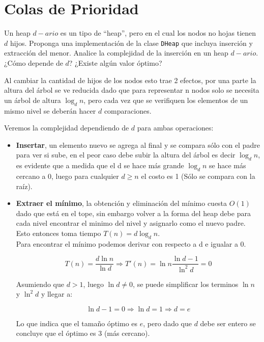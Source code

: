 \documentclass[dcc,sol]{fcfmcourse}
\begin{document}
\section*{Colas de Prioridad}
\begin{problems}
\problem Un heap $d-ario$ es un tipo de ``heap'', pero en el cual los nodos no hojas tienen $d$ hijos. Proponga una implementación de la clase \texttt{DHeap} que incluya inserción y extracción del menor.
\problem Analice la complejidad de la inserción en un heap $d-ario$. ¿Cómo depende de $d$? ¿Existe algún valor óptimo?

\begin{solution}
Al cambiar la cantidad de hijos de los nodos esto trae 2 efectos, por una parte la altura del árbol se ve reducida dado que para representar n nodos solo se necesita un árbol de altura $\log_d{n}$, pero cada vez que se verifiquen los elementos de un mismo nivel se deberán hacer $d$ comparaciones.

Veremos la complejidad dependiendo de $d$ para ambas operaciones:

\begin{itemize}

\item \textbf{Insertar}, un elemento nuevo se agrega al final y se compara sólo con el padre para ver si sube, en el peor caso debe subir la altura del árbol es decir $\log_d{n}$, es evidente que a medida que el d se hace más grande $\log_d{n}$ se hace más cercano a 0, luego para cualquier $d\geq n$ el costo es 1 (Sólo se compara con la raíz). \\

\item \textbf{Extraer el mínimo}, la obtención y eliminación del mínimo cuesta $O(1)$ dado que está en el tope, sin embargo volver a la forma del heap debe para cada nivel encontrar el minimo del nivel y asignarlo como el nuevo padre. Esto entonces toma tiempo $T(n) = d\log_d{n}$. \\

Para encontrar el mínimo podemos derivar con respecto a d e igualar a 0.

\begin{equation*}
    T(n) = \frac{d\ln{n}}{\ln{d}} \Rightarrow
    T'(n) = \ln{n}\frac{\ln{d}-1}{\ln^2{d}} = 0
\end{equation*}

Asumiendo que $d>1$, luego $\ln{d} \neq 0$, se puede simplificar los terminos $\ln{n}$ y $\ln^2{d}$ y llegar a:

\begin{equation*}
    \ln{d}-1=0 \Rightarrow \ln{d} = 1 \Rightarrow d = e
\end{equation*}

Lo que indica que el tamaño óptimo es $e$, pero dado que $d$ debe ser entero se concluye que el óptimo es 3 (más cercano).

\end{itemize}



\end{solution}


\end{problems}
\end{document}
